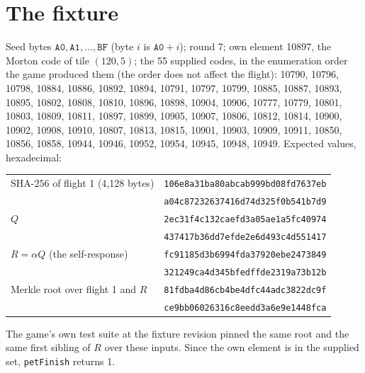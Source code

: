 \documentclass[11pt]{article}
\newcommand{\sha}{\mathrm{SHA\text{-}256}}
\begin{document}
\appendix
\section{The fixture}
\label{app:fixture}
Seed bytes $\mathtt{A0},\mathtt{A1},\ldots,\mathtt{BF}$ (byte $i$ is
$\mathtt{A0}+i$); round 7; own element 10897, the Morton code of tile
$(120,5)$; the 55 supplied codes, in the enumeration order the game produced
them (the order does not affect the flight):
10790, 10796, 10798, 10884, 10886, 10892, 10894, 10791, 10797, 10799, 10885,
10887, 10893, 10895, 10802, 10808, 10810, 10896, 10898, 10904, 10906, 10777,
10779, 10801, 10803, 10809, 10811, 10897, 10899, 10905, 10907, 10806, 10812,
10814, 10900, 10902, 10908, 10910, 10807, 10813, 10815, 10901, 10903, 10909,
10911, 10850, 10856, 10858, 10944, 10946, 10952, 10954, 10945, 10948, 10949.
Expected values, hexadecimal:
\begin{center}
\begin{tabular}{ll}
\toprule
$\sha$ of flight 1 (4,128 bytes) & \texttt{106e8a31ba80abcab999bd08fd7637eb} \\
 & \texttt{a04c87232637416d74d325f0b541b7d9} \\
$Q$ & \texttt{2ec31f4c132caefd3a05ae1a5fc40974} \\
 & \texttt{437417b36dd7efde2e6d493c4d551417} \\
$R=\alpha Q$ (the self-response) & \texttt{fc91185d3b6994fda37920ebe2473849} \\
 & \texttt{321249ca4d345bfedffde2319a73b12b} \\
Merkle root over flight 1 and $R$ & \texttt{81fdba4d86cb4be4dfc44adc3822dc9f} \\
 & \texttt{ce9bb06026316c8eedd3a6e9e1448fca} \\
\bottomrule
\end{tabular}
\end{center}
The game's own test suite at the fixture revision pinned the same root and
the same first sibling of $R$ over these inputs. Since the own element is in
the supplied set, \texttt{petFinish} returns 1.
\end{document}
